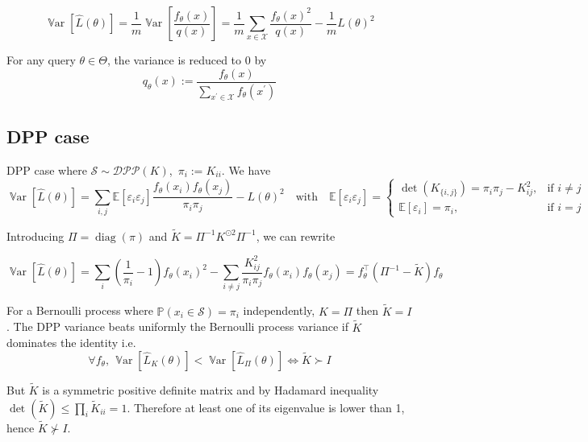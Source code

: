 \documentclass{article}
\renewcommand{\epsilon}{\varepsilon}
\newcommand{\Var}{\operatorname{\mathbb V ar}}
\theoremstyle{definition}
\begin{document}
\begin{equation}
	\Var[\hat L(\theta)] =\frac{1}{m} \Var\left[\frac {f_{\theta}(x)} {q(x)}\right] 
	=\frac{1}{m} \sum_{x \in \mathcal{X}} \frac{f_{\theta}(x)^{2}}{q(x)} -\frac{1}{m} L(\theta)^{2}
\end{equation}

For any query $\theta \in \Theta$, the variance is reduced to 0 by
$$
q_{\theta}(x):=\frac{ f_{\theta}(x)}{\sum_{x^{\prime} \in \mathcal{X}}  f_{\theta}\left(x^{\prime}\right)}
$$

\subsection{DPP case}
DPP case where $ \mathcal S \sim \mathcal{DPP}(K)$, \,$\pi_i := K_{ii}$. We have
$$
\Var[\hat L(\theta)]
=\sum_{i, j}\mathbb{E}\left[\epsilon_{i} \epsilon_{j}\right] \frac{f_\theta(x_{i}) f_\theta(x_{j})} {\pi_{i} \pi_{j}}  - L(\theta)^{2}
\quad \text{with} \quad
\mathbb{E}\left[\epsilon_{i} \epsilon_{j}\right]=
\begin{cases}
	\det\left(K_{\{i, j\}}\right)=\pi_{i} \pi_{j}-K_{i j}^{2}, & \text{if } i \neq j \\
	\mathbb{E}\left[\epsilon_{i}\right]=\pi_{i}, & \text{if } i = j
\end{cases}
$$



Introducing $\Pi = \operatorname{diag}(\pi)$ and $\tilde K = \Pi^{-1}K^{\odot 2} \Pi^{-1}$, we can rewrite  

\begin{equation}
	\Var [\hat L(\theta)]=\sum_{i}\left(\frac{1}{\pi_{i}}-1\right) f_\theta(x_{i})^{2}-\sum_{i \neq j} \frac{K_{i j}^{2}}{\pi_{i} \pi_{j}} f_\theta(x_{i}) f_\theta(x_{j}) =  f_\theta^\top (\Pi^{-1}  - \tilde{K}) f_\theta 
\end{equation}


	
For a Bernoulli process where $\mathbb P(x_i \in \mathcal S) = \pi_i$ independently, $K = \Pi$ then $\tilde K = I$. The DPP variance beats uniformly the Bernoulli process variance if $\tilde K$ dominates the identity i.e. 
\begin{equation}
	\forall f_\theta, \, \Var [\hat L_{K}(\theta)] < \Var [\hat L_{\Pi}(\theta)] \iff \tilde K \succ I
\end{equation}

But $\tilde K$ is a symmetric positive definite matrix and by Hadamard inequality $\det( \tilde K) \leq \prod_{i} \tilde K_{ii}= 1$. Therefore at least one of its eigenvalue is lower than 1, hence $\tilde K \nsucc I$.
\end{document}
